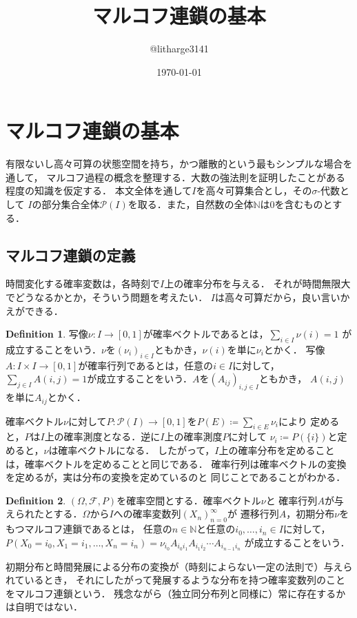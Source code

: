 \documentclass[dvipdfmx,autodetect-engine]{jsarticle}
\theoremstyle{remark}
\theoremstyle{definition}
\newtheorem{definition}{Definition}[section]
\newcommand{\N}{\mathbb{N}}
\begin{document}
\title{マルコフ連鎖の基本}
\author{@litharge3141}
\date{\today}
\maketitle

\section{マルコフ連鎖の基本}
有限ないし高々可算の状態空間を持ち，かつ離散的という最もシンプルな場合を通して，
マルコフ過程の概念を整理する．大数の強法則を証明したことがある程度の知識を仮定する．
本文全体を通して$I$を高々可算集合とし，その$\sigma$-代数として
$I$の部分集合全体$\mathcal{P}(I)$を取る．また，自然数の全体$\N$は$0$を含むものとする．
\subsection{マルコフ連鎖の定義}
時間変化する確率変数は，各時刻で$I$上の確率分布を与える．
それが時間無限大でどうなるかとか，そういう問題を考えたい．
$I$は高々可算だから，良い言いかえができる．

\begin{definition}
    写像$\nu : I \to [0,1]$が確率ベクトルであるとは，$\sum_{i\in I} \nu (i)=1$
    が成立することをいう．$\nu$を$(\nu_i)_{i\in I}$ともかき，$\nu(i)$を単に$\nu_i$とかく．
    写像$A:I\times I \to [0,1]$が確率行列であるとは，任意の$i\in I$に対して，
    $\sum_{j\in I} A(i,j) = 1$が成立することをいう．$A$を$(A_{ij})_{i,j\in I}$ともかき，
    $A(i,j)$を単に$A_{ij}$とかく．
\end{definition}


確率ベクトル$\nu$に対して$P:\mathcal{P}(I) \to [0,1]$を$P(E) \coloneqq \sum_{i \in E} \nu_i$により
定めると，$P$は$I$上の確率測度となる．逆に$I$上の確率測度$P$に対して
$\nu_i \coloneqq P(\{i\})$と定めると，$\nu$は確率ベクトルになる．
したがって，$I$上の確率分布を定めることは，確率ベクトルを定めることと同じである．
確率行列は確率ベクトルの変換を定めるが，実は分布の変換を定めているのと
同じことであることがわかる．


\begin{definition}
    $(\Omega,\mathcal{F},P)$を確率空間とする．確率ベクトル$\nu$と
    確率行列$A$が与えられたとする．$\Omega$から$I$への確率変数列$(X_n)_{n=0}^{\infty}$が
    遷移行列$A$，初期分布$\nu$をもつマルコフ連鎖であるとは，
    任意の$n \in \N$と任意の$i_0,\ldots,i_{n} \in I$に対して，
    $P(X_{0} = i_{0}, X_{1}=i_{1},\ldots,X_n = i_n) = 
    \nu_{i_0} A_{i_0 i_1} A_{i_1 i_2}\cdots A_{i_{n-1} i_n}$
    が成立することをいう．
\end{definition}

初期分布と時間発展による分布の変換が（時刻によらない一定の法則で）与えられているとき，
それにしたがって発展するような分布を持つ確率変数列のことをマルコフ連鎖という．
残念ながら（独立同分布列と同様に）常に存在するかは自明ではない．
\end{document}
